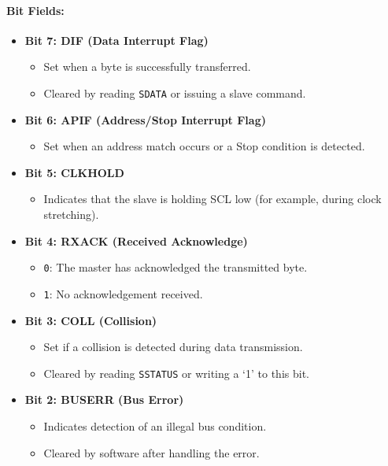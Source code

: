 \paragraph{Bit Fields:}
\begin{itemize}[leftmargin=*,itemsep=2mm]
  \item \textbf{Bit 7: DIF (Data Interrupt Flag)}  
        \begin{itemize}
          \item Set when a byte is successfully transferred.
          \item Cleared by reading \texttt{SDATA} or issuing a slave command.
        \end{itemize}
  \item \textbf{Bit 6: APIF (Address/Stop Interrupt Flag)}  
        \begin{itemize}
          \item Set when an address match occurs or a Stop condition is detected.
        \end{itemize}
  \item \textbf{Bit 5: CLKHOLD}  
        \begin{itemize}
          \item Indicates that the slave is holding SCL low (for example, during clock stretching).
        \end{itemize}
  \item \textbf{Bit 4: RXACK (Received Acknowledge)}  
        \begin{itemize}
          \item \texttt{0}: The master has acknowledged the transmitted byte.
          \item \texttt{1}: No acknowledgement received.
        \end{itemize}
  \item \textbf{Bit 3: COLL (Collision)}  
        \begin{itemize}
          \item Set if a collision is detected during data transmission.
          \item Cleared by reading \texttt{SSTATUS} or writing a ‘1’ to this bit.
        \end{itemize}
  \item \textbf{Bit 2: BUSERR (Bus Error)}  
        \begin{itemize}
          \item Indicates detection of an illegal bus condition.
          \item Cleared by software after handling the error.

\end{itemize}
\end{itemize}
